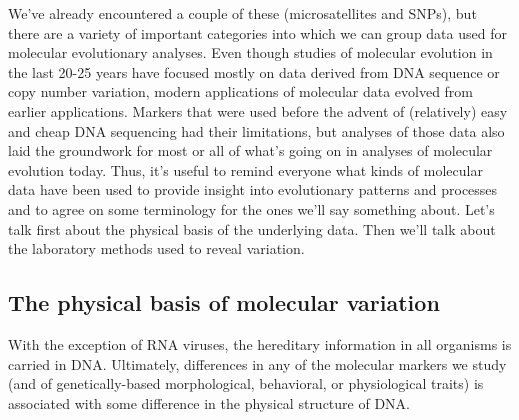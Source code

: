 We've already encountered a couple of these (microsatellites and
SNPs), but there are a variety of important categories into which we
can group data used for molecular evolutionary analyses. Even though
studies of molecular evolution in the last 20-25 years have focused
mostly on data derived from DNA sequence or copy number variation,
modern applications of molecular data evolved from earlier
applications. Markers that were used before the advent of (relatively)
easy and cheap DNA sequencing had their limitations, but analyses of
those data also laid the groundwork for most or all of what's going on
in analyses of molecular evolution today. Thus, it's useful to remind
everyone what kinds of molecular data have been used to provide
insight into evolutionary patterns and processes and to agree on some
terminology for the ones we'll say something about. Let's talk first
about the physical basis of the underlying data. Then we'll talk about
the laboratory methods used to reveal variation.

\subsection*{The physical basis of molecular variation}

With the exception of RNA viruses, the hereditary information in all
organisms is carried in DNA. Ultimately, differences in any of the
molecular markers we study (and of genetically-based morphological,
behavioral, or physiological traits) is associated with some
difference in the physical structure of DNA.

